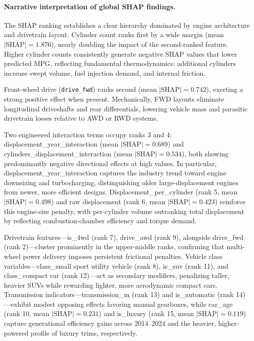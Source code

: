 \paragraph{Narrative interpretation of global SHAP findings.}
The SHAP ranking establishes a clear hierarchy dominated by engine architecture and drivetrain layout. Cylinder count ranks first by a wide margin (mean \(|\text{SHAP}| = 1.876\)), nearly doubling the impact of the second-ranked feature. Higher cylinder counts consistently generate negative SHAP values that lower predicted MPG, reflecting fundamental thermodynamics: additional cylinders increase swept volume, fuel injection demand, and internal friction.

Front-wheel drive (\texttt{drive\_fwd}) ranks second (mean \(|\text{SHAP}| = 0.742\)), exerting a strong positive effect when present. Mechanically, FWD layouts eliminate longitudinal driveshafts and rear differentials, lowering vehicle mass and parasitic drivetrain losses relative to AWD or RWD systems.

Two engineered interaction terms occupy ranks 3 and 4: displacement\_year\_interaction (mean \(|\text{SHAP}| = 0.689\)) and cylinders\_displacement\_interaction (mean \(|\text{SHAP}| = 0.534\)), both showing predominantly negative directional effects at high values. In particular, displacement\_year\_interaction captures the industry trend toward engine downsizing and turbocharging, distinguishing older large-displacement engines from newer, more efficient designs. Displacement\_per\_cylinder (rank 5, mean \(|\text{SHAP}| = 0.498\)) and raw displacement (rank 6, mean \(|\text{SHAP}| = 0.423\)) reinforce this engine-size penalty, with per-cylinder volume outranking total displacement by reflecting combustion-chamber efficiency and torque demand.

Drivetrain features---is\_4wd (rank 7), drive\_awd (rank 9), alongside drive\_fwd (rank 2)---cluster prominently in the upper-middle ranks, confirming that multi-wheel power delivery imposes persistent frictional penalties. Vehicle class variables---class\_small sport utility vehicle (rank 8), is\_suv (rank 11), and class\_compact car (rank 12)---act as secondary modifiers, penalizing taller, heavier SUVs while rewarding lighter, more aerodynamic compact cars. Transmission indicators---transmission\_m (rank 13) and is\_automatic (rank 14)---exhibit modest opposing effects favoring manual gearboxes, while car\_age (rank 10, mean \(|\text{SHAP}| = 0.231\)) and is\_luxury (rank 15, mean \(|\text{SHAP}| = 0.119\)) capture generational efficiency gains across 2014--2024 and the heavier, higher-powered profile of luxury trims, respectively.

